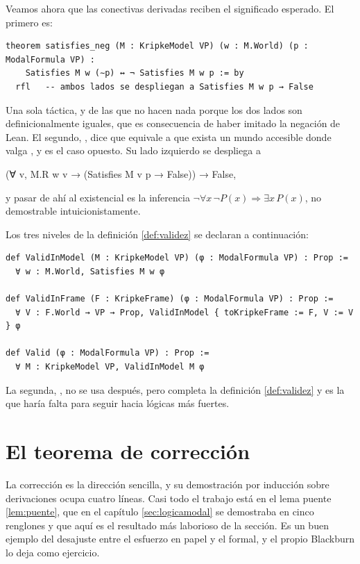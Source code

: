 Veamos ahora que las conectivas derivadas reciben el significado esperado. El primero es:

\begin{lstlisting}
theorem satisfies_neg (M : KripkeModel VP) (w : M.World) (p : ModalFormula VP) :
    Satisfies M w (∼p) ↔ ¬ Satisfies M w p := by
  rfl   -- ambos lados se despliegan a Satisfies M w p → False
\end{lstlisting}

Una sola táctica, y de las que no hacen nada porque los dos lados son definicionalmente iguales, que es consecuencia de haber imitado la negación de Lean. El segundo, , dice que  equivale a que exista un mundo accesible donde valga , y es el caso opuesto. Su lado izquierdo se despliega a

\begin{leansnippet}
(∀ v, M.R w v → (Satisfies M v p → False)) → False,
\end{leansnippet}

\noindent y pasar de ahí al existencial es la inferencia $\lnot\forall x\,\lnot P(x) \Rightarrow \exists x\, P(x)$, no demostrable intuicionistamente.

Los tres niveles de la definición \ref{def:validez} se declaran a continuación:

\begin{lstlisting}
def ValidInModel (M : KripkeModel VP) (φ : ModalFormula VP) : Prop :=
  ∀ w : M.World, Satisfies M w φ

def ValidInFrame (F : KripkeFrame) (φ : ModalFormula VP) : Prop :=
  ∀ V : F.World → VP → Prop, ValidInModel { toKripkeFrame := F, V := V } φ

def Valid (φ : ModalFormula VP) : Prop :=
  ∀ M : KripkeModel VP, ValidInModel M φ
\end{lstlisting}

La segunda, , no se usa después, pero completa la definición \ref{def:validez} y es la que haría falta para seguir hacia lógicas más fuertes.

\section{El teorema de corrección}\label{sec:form-correccion}

La corrección es la dirección sencilla, y su demostración por inducción sobre derivaciones ocupa cuatro líneas. Casi todo el trabajo está en el lema puente \ref{lem:puente}, que en el capítulo \ref{sec:logicamodal} se demostraba en cinco renglones y que aquí es el resultado más laborioso de la sección. Es un buen ejemplo del desajuste entre el esfuerzo en papel y el formal, y el propio Blackburn lo deja como ejercicio.

